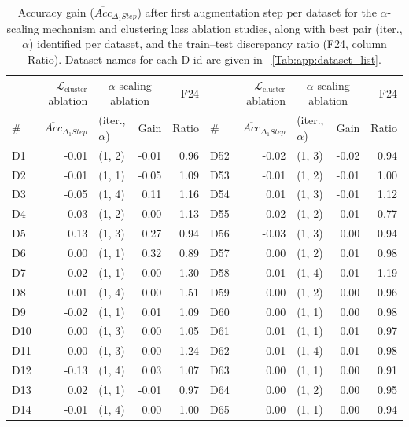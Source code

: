 \begin{table}[p]
\centering
\caption{Accuracy gain ($\overline{Acc}_{\Delta_1 Step}$) after first augmentation step per dataset for the $\alpha$-scaling mechanism and clustering loss ablation studies, along with best pair (iter., $\alpha$) identified per dataset, and the train--test discrepancy ratio (F24, column Ratio). Dataset names for each D-id are given in \tablename~\ref{Tab:app:dataset_list}.}\label{Tab:app:Ablation_clustering_alpha}
\footnotesize
\setlength{\tabcolsep}{3pt}
\begin{tabular}{l|r|lr|r||l|r|lr|r}
\toprule
 & $\mathcal{L}_{\text{cluster}}$ ablation & \multicolumn{2}{c|}{$\alpha$-scaling ablation} & F24 & & $\mathcal{L}_{\text{cluster}}$ ablation & \multicolumn{2}{c|}{$\alpha$-scaling ablation} & F24 \\
\# & $\overline{Acc}_{\Delta_1 Step}$ & (iter., $\alpha$) & Gain & Ratio & \# & $\overline{Acc}_{\Delta_1 Step}$ & (iter., $\alpha$) & Gain & Ratio \\
\midrule
D1 & -0.01 & (1, 2) & -0.01 & 0.96 & D52 & -0.02 & (1, 3) & -0.02 & 0.94 \\
D2 & -0.01 & (1, 1) & -0.05 & 1.09 & D53 & -0.01 & (1, 2) & -0.01 & 1.00 \\
D3 & -0.05 & (1, 4) & 0.11 & 1.16 & D54 & 0.01 & (1, 3) & -0.01 & 1.12 \\
D4 & 0.03 & (1, 2) & 0.00 & 1.13 & D55 & -0.02 & (1, 2) & -0.01 & 0.77 \\
D5 & 0.13 & (1, 3) & 0.27 & 0.94 & D56 & -0.03 & (1, 3) & 0.00 & 0.94 \\
D6 & 0.00 & (1, 1) & 0.32 & 0.89 & D57 & 0.00 & (1, 2) & 0.01 & 0.98 \\
D7 & -0.02 & (1, 1) & 0.00 & 1.30 & D58 & 0.01 & (1, 4) & 0.01 & 1.19 \\
D8 & 0.01 & (1, 4) & 0.00 & 1.51 & D59 & 0.00 & (1, 2) & 0.00 & 0.96 \\
D9 & -0.02 & (1, 1) & 0.01 & 1.09 & D60 & 0.00 & (1, 1) & 0.00 & 0.98 \\
D10 & 0.00 & (1, 3) & 0.00 & 1.05 & D61 & 0.01 & (1, 1) & 0.01 & 0.97 \\
D11 & 0.00 & (1, 3) & 0.00 & 1.24 & D62 & 0.01 & (1, 4) & 0.01 & 0.98 \\
D12 & -0.13 & (1, 4) & 0.03 & 1.07 & D63 & 0.00 & (1, 1) & 0.00 & 0.91 \\
D13 & 0.02 & (1, 1) & -0.01 & 0.97 & D64 & 0.00 & (1, 2) & 0.00 & 0.95 \\
D14 & -0.01 & (1, 4) & 0.00 & 1.00 & D65 & 0.00 & (1, 1) & 0.00 & 0.94 \\

\end{tabular}
\end{table}

